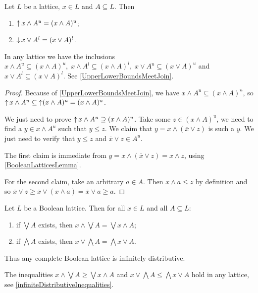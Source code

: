\begin{lemma}
Let $L$ be a lattice, $x\in L$ and $A\subseteq L$. Then
\begin{enumerate}
\item $\operatorname{\uparrow} x\wedge A^u = (x\wedge A)^u$;
\item $\operatorname{\downarrow} x\vee A^l = (x\vee A)^l$.
\end{enumerate}
\end{lemma}
In any lattice we have the inclusions $x\wedge A^u \subseteq (x\wedge A)^u, \;x\wedge A^l \subseteq (x\wedge A)^l, \;x\vee A^u \subseteq (x\vee A)^u$ and $x\vee A^l \subseteq (x\vee A)^l$. See \ref{UpperLowerBoundsMeetJoin}.
\begin{proof}
Because of \ref{UpperLowerBoundsMeetJoin}, we have $x\wedge A^u \subseteq (x\wedge A)^u$, so $\operatorname{\uparrow} x\wedge A^u \subseteq \operatorname{\uparrow}(x\wedge A)^u = (x\wedge A)^u$.

We just need to prove $\operatorname{\uparrow} x\wedge A^u \supseteq (x\wedge A)^u$. Take some $z\in (x\wedge A)^u$, we need to find a $y\in x\wedge A^u$ such that $y \leq z$. We claim that $y = x\wedge (\overline{x}\vee z)$ is such a $y$. We just need to verify that $y \leq z$ and $\overline{x}\vee z \in A^u$.

The first claim is immediate from $y = x\wedge (\overline{x}\vee z) = x\wedge z$, using \ref{BooleanLatticesLemma}.

For the second claim, take an arbitrary $a\in A$. Then $x\wedge a \leq z$ by definition and so $\overline{x}\vee z \geq \overline{x}\vee (x\wedge a) = \overline{x}\vee a \geq a$.
\end{proof}
\begin{corollary}
Let $L$ be a Boolean lattice. Then for all $x\in L$ and all $A\subseteq L$:
\begin{enumerate}
\item if $\bigvee A$ exists, then $x\wedge \bigvee A = \bigvee x\wedge A$;
\item if $\bigwedge A$ exists, then $x\vee \bigwedge A = \bigwedge x\vee A$.
\end{enumerate}
Thus any complete Boolean lattice is infinitely distributive.
\end{corollary}
The inequalities $x\wedge \bigvee A \geq \bigvee x\wedge A$ and $x\vee \bigwedge A \leq \bigwedge x\vee A$ hold in any lattice, see \ref{infiniteDistributiveInequalities}.

